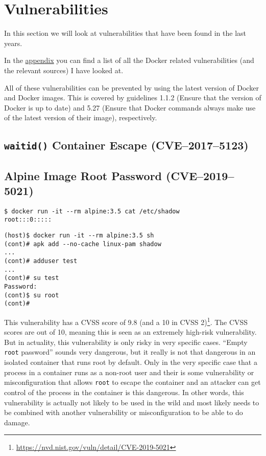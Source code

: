 \section{Vulnerabilities}
In this section we will look at vulnerabilities that have been found in the last years.

\hfill

In the \hyperref[appendix:CVE-List]{appendix} you can find a list of all the Docker related vulnerabilities (and the relevant sources) I have looked at.

\hfill

All of these vulnerabilities can be prevented by using the latest version of Docker and Docker images. This is covered by guidelines 1.1.2 (Ensure that the version of Docker is up to date) and 5.27 (Ensure that Docker commands always make use of the latest version of their image), respectively.

\subsection{\texorpdfstring{\lstinline{waitid()}}{waitid()} Container Escape (CVE--2017--5123)}

\subsection{Alpine Image Root Password (CVE--2019--5021)}\label{CVE-2019-5021}
\begin{lstlisting}
$ docker run -it --rm alpine:3.5 cat /etc/shadow
root:::0:::::
\end{lstlisting}

\begin{lstlisting}
(host)$ docker run -it --rm alpine:3.5 sh
(cont)# apk add --no-cache linux-pam shadow
...
(cont)# adduser test
...
(cont)# su test
Password:
(cont)$ su root
(cont)#
\end{lstlisting}

This vulnerability has a CVSS score of 9.8 (and a 10 in CVSS 2)\footnote{\url{https://nvd.nist.gov/vuln/detail/CVE-2019-5021}}. The CVSS scores are out of 10, meaning this is seen as an extremely high-risk vulnerability. But in actuality, this vulnerability is only risky in very specific cases. ``Empty \lstinline{root} password'' sounds very dangerous, but it really is not that dangerous in an isolated container that runs root by default. Only in the very specific case that a process in a container runs as a non-root user and their is some vulnerability or misconfiguration that allows \lstinline{root} to escape the container and an attacker can get control of the process in the container is this dangerous. In other words, this vulnerability is actually not likely to be used in the wild and most likely needs to be combined with another vulnerability or misconfiguration to be able to do damage.

